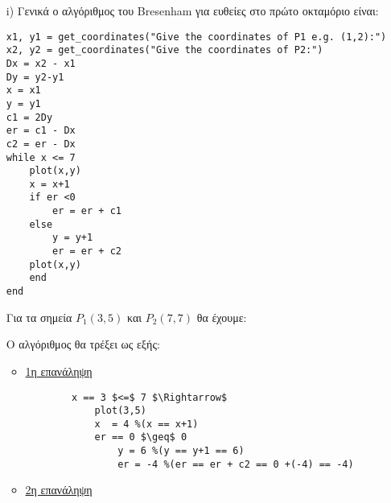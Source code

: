 \begin{solution}

\begin{enumerate}
	
\item[i)] Γενικά ο αλγόριθμος του Bresenham για ευθείες στο πρώτο οκταμόριο είναι:

\begin{lstlisting}[caption={Αλγόριθμος του Bresenham για ζητούμενο ευθύγραμμο τμήμα}]
x1, y1 = get_coordinates("Give the coordinates of P1 e.g. (1,2):")
x2, y2 = get_coordinates("Give the coordinates of P2:")
Dx = x2 - x1
Dy = y2-y1
x = x1
y = y1
c1 = 2Dy
er = c1 - Dx
c2 = er - Dx
while x <= 7
    plot(x,y)
    x = x+1
    if er <0
        er = er + c1
    else
        y = y+1
        er = er + c2
    plot(x,y)
    end
end	
\end{lstlisting}

Για τα σημεία $P_1(3,5)$ και $P_2(7,7)$ θα έχουμε:

\begin{itemize}[noitemsep, topsep=0pt] %
\end{itemize}

Ο αλγόριθμος θα τρέξει ως εξής:

\lstset{style=tt} 
    
\begin{itemize}
  \item \underline{1η επανάληψη}

		\begin{lstlisting}
		x == 3 $<=$ 7 $\Rightarrow$
			plot(3,5) 
			x  = 4 %(x == x+1) 
			er == 0 $\geq$ 0 
				y = 6 %(y == y+1 == 6) 
				er = -4 %(er == er + c2 == 0 +(-4) == -4)
		\end{lstlisting}
		
	\item  \underline{2η επανάληψη}
		

\end{itemize}
\end{enumerate}
\end{solution}
